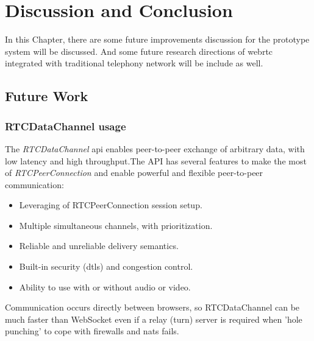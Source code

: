 \chapter{Discussion and Conclusion}
\label{chp:future_work}

\noindent In this Chapter, there are some future improvements discussion for the prototype system will be discussed. And some future research directions of \gls{webrtc} integrated with traditional telephony network will be include as well.

\section{Future Work}

\subsection{RTCDataChannel usage}

\par The \textit{RTCDataChannel} \gls{api} enables peer-to-peer exchange of arbitrary data, with low latency and high throughput.The API has several features to make the most of \textit{RTCPeerConnection} and enable powerful and flexible peer-to-peer communication\cite{html5rock:webrtc}:

\begin{itemize}[topsep=-1em,parsep=0em,itemsep=0em]
    \item Leveraging of RTCPeerConnection session setup.
    \item Multiple simultaneous channels, with prioritization.
    \item Reliable and unreliable delivery semantics.
    \item Built-in security (\gls{dtls}) and congestion control.
    \item Ability to use with or without audio or video.
\end{itemize}

\par Communication occurs directly between browsers, so RTCDataChannel can be much faster than WebSocket even if a relay (\gls{turn}) server is required when 'hole punching' to cope with firewalls and \gls{nat}s fails.

